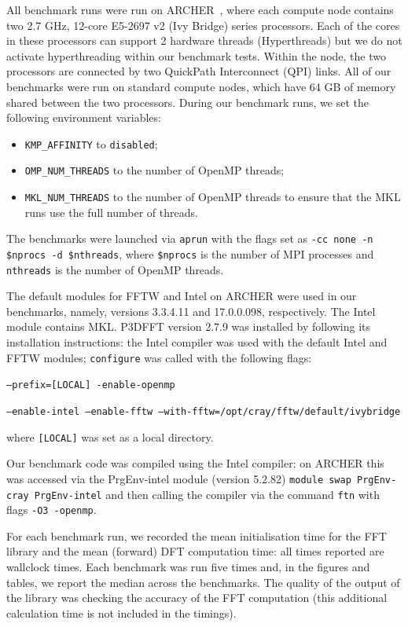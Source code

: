 \documentclass[a4paper]{article}
\begin{document}
All benchmark runs were run on ARCHER~\cite{ARCHER}, where each compute
node contains two 2.7 GHz, 12-core E5-2697 v2 (Ivy Bridge) series
processors. Each of the cores in these processors can support 2
hardware threads (Hyperthreads) but we do not activate hyperthreading
within our benchmark tests. Within the node, the two processors are
connected by two QuickPath Interconnect (QPI) links. All of our
benchmarks were run on standard compute nodes, which have 64 GB of
memory shared between the two processors. During our benchmark runs,
we set the following environment variables:
\begin{itemize}
\item \texttt{KMP\_AFFINITY} to \texttt{disabled};
\item \texttt{OMP\_NUM\_THREADS} to the number of OpenMP threads;
\item \texttt{MKL\_NUM\_THREADS} to the number of OpenMP threads to
  ensure that the MKL runs use the full number of threads.
\end{itemize}
The benchmarks were launched via \texttt{aprun} with the flags set as
\texttt{-cc none -n \$nprocs -d \$nthreads}, where \texttt{\$nprocs}
is the number of MPI processes and \texttt{nthreads} is the number of
OpenMP threads.

The default modules for FFTW and Intel on ARCHER were used in our
benchmarks, namely, versions 3.3.4.11 and 17.0.0.098,
respectively. The Intel module contains MKL.  P3DFFT version 2.7.9 was
installed by following its installation instructions: the Intel
compiler was used with the default Intel and FFTW modules;
\texttt{configure} was called with the following flags:

\noindent \texttt{--prefix=[LOCAL] -enable-openmp}

\noindent \texttt{--enable-intel --enable-fftw
  --with-fftw=/opt/cray/fftw/default/ivybridge}

\noindent where \texttt{[LOCAL]} was set as a local directory.

Our benchmark code was compiled using the Intel compiler: on ARCHER
this was accessed via the PrgEnv-intel module (version 5.2.82)
\noindent \texttt{module swap PrgEnv-cray PrgEnv-intel} and then
calling the compiler via the command \texttt{ftn} with flags
\texttt{-O3 -openmp}.

For each benchmark run, we recorded the mean initialisation time for
the FFT library and the mean (forward) DFT computation time: all times
reported are wallclock times. Each benchmark was run five times and,
in the figures and tables, we report the median across the
benchmarks. The quality of the output of the library was checking the
accuracy of the FFT computation (this additional calculation time is
not included in the timings).
\end{document}
